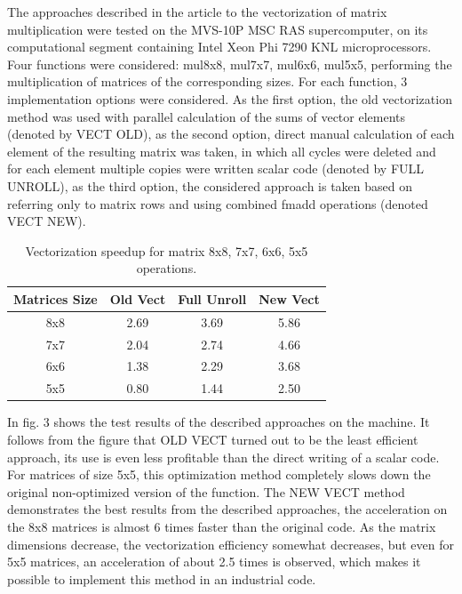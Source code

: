 \documentclass[
11pt,%
tightenlines,%
twoside,%
onecolumn,%
nofloats,%
nobibnotes,%
nofootinbib,%
superscriptaddress,%
noshowpacs,%
centertags]%
{revtex4}
\begin{document}
The approaches described in the article to the vectorization of matrix multiplication were tested on the MVS-10P MSC RAS ​​supercomputer, on its computational segment containing Intel Xeon Phi 7290 KNL microprocessors. Four functions were considered: mul8x8, mul7x7, mul6x6, mul5x5, performing the multiplication of matrices of the corresponding sizes. For each function, 3 implementation options were considered. As the first option, the old vectorization method was used with parallel calculation of the sums of vector elements (denoted by VECT OLD), as the second option, direct manual calculation of each element of the resulting matrix was taken, in which all cycles were deleted and for each element multiple copies were written scalar code (denoted by FULL UNROLL), as the third option, the considered approach is taken based on referring only to matrix rows and using combined fmadd operations (denoted VECT NEW).

\begin{table}[!h]
\setcaptionmargin{0mm}
\onelinecaptionsfalse
{}
\caption{Vectorization speedup for matrix 8x8, 7x7, 6x6, 5x5 operations.}
\bigskip
\begin{tabular}{|c|c|c|c|}
\hline
\textbf{Matrices Size} & \textbf{Old Vect} & \textbf{Full Unroll} & \textbf{New Vect} \\
\hline
8x8 & 2.69 & 3.69 & 5.86 \\
7x7 & 2.04 & 2.74 & 4.66 \\
6x6 & 1.38 & 2.29 & 3.68 \\
5x5 & 0.80 & 1.44 & 2.50 \\
\hline
\end{tabular}
\end{table}

In fig. 3 shows the test results of the described approaches on the machine. It follows from the figure that OLD VECT turned out to be the least efficient approach, its use is even less profitable than the direct writing of a scalar code. For matrices of size 5x5, this optimization method completely slows down the original non-optimized version of the function. The NEW VECT method demonstrates the best results from the described approaches, the acceleration on the 8x8 matrices is almost 6 times faster than the original code. As the matrix dimensions decrease, the vectorization efficiency somewhat decreases, but even for 5x5 matrices, an acceleration of about 2.5 times is observed, which makes it possible to implement this method in an industrial code.
\end{document}
